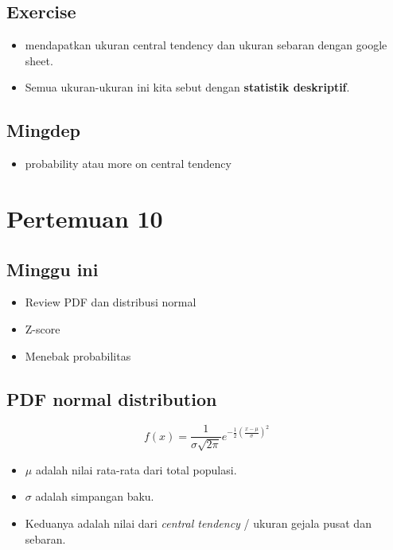 \documentclass[
  letterpaper,
  DIV=11,
  numbers=noendperiod]{scrartcl}
\providecommand{\tightlist}{%
  \setlength{\itemsep}{0pt}\setlength{\parskip}{0pt}}\usepackage{longtable,booktabs,array}
\begin{document}
\hypertarget{exercise-1}{%
\subsection{Exercise}\label{exercise-1}}

\begin{itemize}
\item
  mendapatkan ukuran central tendency dan ukuran sebaran dengan google
  sheet.
\item
  Semua ukuran-ukuran ini kita sebut dengan \textbf{statistik
  deskriptif}.
\end{itemize}

\hypertarget{mingdep-2}{%
\subsection{Mingdep}\label{mingdep-2}}

\begin{itemize}
\tightlist
\item
  probability atau more on central tendency
\end{itemize}

\hypertarget{pertemuan-10}{%
\section{Pertemuan 10}\label{pertemuan-10}}

\hypertarget{minggu-ini-1}{%
\subsection{Minggu ini}\label{minggu-ini-1}}

\begin{itemize}
\item
  Review PDF dan distribusi normal
\item
  Z-score
\item
  Menebak probabilitas
\end{itemize}

\hypertarget{pdf-normal-distribution}{%
\subsection{PDF normal distribution}\label{pdf-normal-distribution}}

\[
f(x)=\frac{1}{\sigma \sqrt{2\pi}}e^{-\frac{1}{2}\left(\frac{x-\mu}{\sigma}\right)^2}
\]

\begin{itemize}
\item
  \(\mu\) adalah nilai rata-rata dari total populasi.
\item
  \(\sigma\) adalah simpangan baku.
\item
  Keduanya adalah nilai dari \emph{central tendency} / ukuran gejala
  pusat dan sebaran.
\end{itemize}
\end{document}
